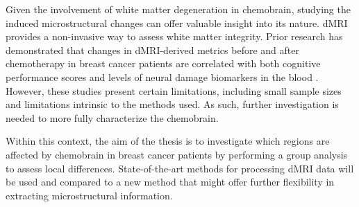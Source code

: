 Given the involvement of white matter degeneration in chemobrain, studying the induced microstructural changes can offer valuable insight into its nature. dMRI provides a non-invasive way to assess white matter integrity. Prior research has demonstrated that changes in dMRI-derived metrics before and after chemotherapy in breast cancer patients are correlated with both cognitive performance scores and levels of neural damage biomarkers in the blood \cite{Deprez2011, Schroyen2021}. However, these studies present certain limitations, including small sample sizes and limitations intrinsic to the methods used. As such, further investigation is needed to more fully characterize the chemobrain.

Within this context, the aim of the thesis is to investigate which regions are affected by chemobrain in breast cancer patients by performing a group analysis to assess local differences. State-of-the-art methods for processing dMRI data will be used and compared to a new method that might offer further flexibility in extracting microstructural information.



